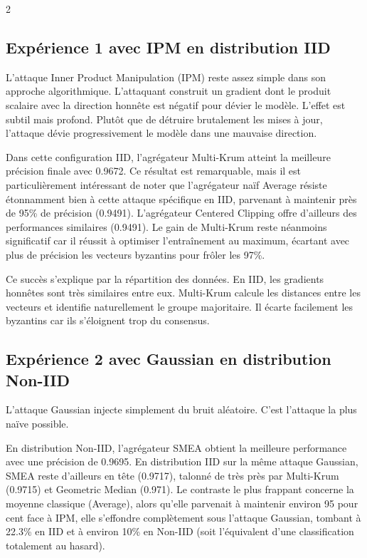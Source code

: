\documentclass{article}
\begin{document}
\begin{multicols}{2}
\subsection{Exp\'erience 1 avec IPM en distribution IID}

L'attaque Inner Product Manipulation (IPM) reste assez simple dans son approche algorithmique. L'attaquant construit un gradient dont le produit scalaire avec la direction honn\^ete est n\'egatif pour d\'evier le mod\`ele. L'effet est subtil mais profond. Plut\^ot que de d\'etruire brutalement les mises \`a jour, l'attaque d\'evie progressivement le mod\`ele dans une mauvaise direction.

Dans cette configuration IID, l'agr\'egateur Multi-Krum atteint la meilleure pr\'ecision finale avec 0.9672. Ce r\'esultat est remarquable, mais il est particuli\`erement int\'eressant de noter que l'agr\'egateur na\"if Average r\'esiste \'etonnamment bien \`a cette attaque sp\'ecifique en IID, parvenant \`a maintenir pr\`es de 95\% de pr\'ecision (0.9491). L'agr\'egateur Centered Clipping offre d'ailleurs des performances similaires (0.9491). Le gain de Multi-Krum reste n\'eanmoins significatif car il r\'eussit \`a optimiser l'entra\^inement au maximum, \'ecartant avec plus de pr\'ecision les vecteurs byzantins pour fr\^oler les 97\%.

Ce succ\`es s'explique par la r\'epartition des donn\'ees. En IID, les gradients honn\^etes sont tr\`es similaires entre eux. Multi-Krum calcule les distances entre les vecteurs et identifie naturellement le groupe majoritaire. Il \'ecarte facilement les byzantins car ils s'\'eloignent trop du consensus.

\subsection{Exp\'erience 2 avec Gaussian en distribution Non-IID}

L'attaque Gaussian injecte simplement du bruit al\'eatoire. C'est l'attaque la plus na\"ive possible.

En distribution Non-IID, l'agr\'egateur SMEA obtient la meilleure performance avec une pr\'ecision de 0.9695. En distribution IID sur la m\^eme attaque Gaussian, SMEA reste d'ailleurs en t\^ete (0.9717), talonn\'e de tr\`es pr\`es par Multi-Krum (0.9715) et Geometric Median (0.971). Le contraste le plus frappant concerne la moyenne classique (Average), alors qu'elle parvenait \`a maintenir environ 95 pour cent face \`a IPM, elle s'effondre compl\`etement sous l'attaque Gaussian, tombant \`a 22.3\% en IID et \`a environ 10\% en Non-IID (soit l'\'equivalent d'une classification totalement au hasard).


\end{multicols}
\end{document}
